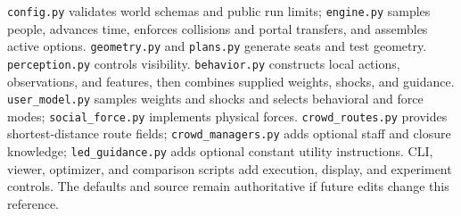 \documentclass[11pt]{article}
\begin{document}
\texttt{config.\allowbreak{}py} validates world schemas and public run limits; \texttt{engine.\allowbreak{}py} samples people, advances time, enforces collisions and portal transfers, and assembles active options. \texttt{geometry.\allowbreak{}py} and \texttt{plans.\allowbreak{}py} generate seats and test geometry. \texttt{perception.\allowbreak{}py} controls visibility. \texttt{behavior.\allowbreak{}py} constructs local actions, observations, and features, then combines supplied weights, shocks, and guidance. \texttt{user\_\allowbreak{}model.\allowbreak{}py} samples weights and shocks and selects behavioral and force modes; \texttt{social\_\allowbreak{}force.\allowbreak{}py} implements physical forces. \texttt{crowd\_\allowbreak{}routes.\allowbreak{}py} provides shortest-distance route fields; \texttt{crowd\_\allowbreak{}managers.\allowbreak{}py} adds optional staff and closure knowledge; \texttt{led\_\allowbreak{}guidance.\allowbreak{}py} adds optional constant utility instructions. CLI, viewer, optimizer, and comparison scripts add execution, display, and experiment controls. The defaults and source remain authoritative if future edits change this reference.
\end{document}
